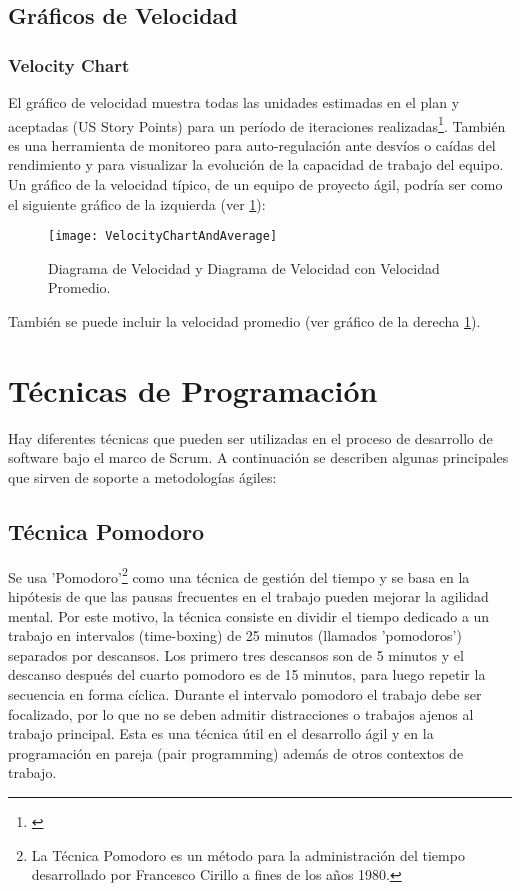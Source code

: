 \newpage
\subsection{Gráficos de Velocidad}

\subsubsection{Velocity Chart}

El gráfico de velocidad muestra todas las unidades estimadas en el plan y aceptadas (US Story Points) para un período de iteraciones realizadas\footnote{\cite{Scrum-Alliance-2014}}. También es una herramienta de monitoreo para auto-regulación ante desvíos o caídas del rendimiento y para visualizar la evolución de la capacidad de trabajo del equipo. Un gráfico de la velocidad típico, de un equipo de proyecto ágil, podría ser como el siguiente gráfico de la izquierda (ver \ref{fig:VelocityChartAndAverage}):

\begin{figure}[h]
  \centering
  \texttt{[image: VelocityChartAndAverage]}
  \caption{Diagrama de Velocidad y Diagrama de Velocidad con Velocidad Promedio.}
  \centering
  \label{fig:VelocityChartAndAverage} %
\end{figure}

También se puede incluir la velocidad promedio (ver gráfico de la derecha \ref{fig:VelocityChartAndAverage}).


\newpage
\section{Técnicas de Programación}

Hay diferentes técnicas que pueden ser utilizadas en el proceso de desarrollo de software bajo el marco de Scrum. A continuación se describen algunas principales que sirven de soporte a metodologías ágiles:

\subsection{Técnica Pomodoro}

Se usa 'Pomodoro'\footnote{La Técnica Pomodoro es un método para la administración del tiempo desarrollado por Francesco Cirillo a fines de los años 1980\cite{Cirillo-Francesco-1980}.} como una técnica de gestión del tiempo y se basa en la hipótesis de que las pausas frecuentes en el trabajo pueden mejorar la agilidad mental. Por este motivo, la técnica consiste en dividir el tiempo dedicado a un trabajo en intervalos (time-boxing) de 25 minutos (llamados 'pomodoros') separados por descansos. Los primero tres descansos son de 5 minutos y el descanso después del cuarto pomodoro es de 15 minutos, para luego repetir la secuencia en forma cíclica. Durante el intervalo pomodoro el trabajo debe ser focalizado, por lo que no se deben admitir distracciones o trabajos ajenos al trabajo principal. 
Esta es una técnica útil en el desarrollo ágil y en la programación en pareja (pair programming) además de otros contextos de trabajo.

